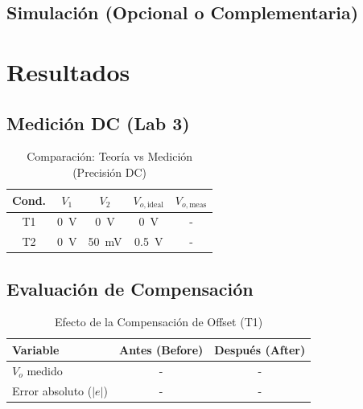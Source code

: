 \documentclass[conference]{IEEEtran}
\begin{document}
\subsection{Simulación (Opcional o Complementaria)}

\section{Resultados}

\subsection{Medición DC (Lab 3)}
\begin{table}[htbp]
    \centering
    \caption{Comparación: Teoría vs Medición (Precisión DC)}
    \label{tab:resultados_dc}
    \begin{tabular}{ccccc}
        \toprule
        \textbf{Cond.} & \textbf{$V_{1}$} & \textbf{$V_{2}$} & \textbf{$V_{o,\mathrm{ideal}}$} & \textbf{$V_{o,\mathrm{meas}}$} \\
        \midrule
        T1 & \SI{0}{\volt} & \SI{0}{\volt} & \SI{0}{\volt} & - \\
        T2 & \SI{0}{\volt} & \SI{50}{\milli\volt} & \SI{0.5}{\volt} & - \\
        \bottomrule
    \end{tabular}
\end{table}

\subsection{Evaluación de Compensación}
\begin{table}[htbp]
    \centering
    \caption{Efecto de la Compensación de Offset (T1)}
    \label{tab:compensacion}
    \begin{tabular}{lcc}
        \toprule
        \textbf{Variable} & \textbf{Antes (Before)} & \textbf{Después (After)} \\
        \midrule
        $V_{o}$ medido & - & - \\
        Error absoluto ($|e|$) & - & - \\
        \bottomrule
    \end{tabular}
\end{table}
\end{document}
